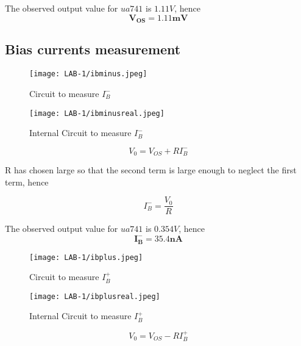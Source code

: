 \documentclass[12pt]{article}
\begin{document}
        The observed output value for $ua 741$ is  $1.11V$, hence \begin{equation}
            \boxed{\mathbf{V_{OS} = 1.11mV}}
        \end{equation}
      
      \subsection{Bias currents measurement}
        \begin{figure}[H]
            \centering
            \texttt{[image: LAB-1/ibminus.jpeg]}
            \caption{Circuit to measure $I^-_B$}
        \end{figure}
        \begin{figure}[H]
            \centering
            \texttt{[image: LAB-1/ibminusreal.jpeg]}
            \caption{Internal Circuit to measure $I^-_B$}
        \end{figure}
        \begin{equation}
            V_0 = V_{OS} + RI^-_B
        \end{equation}
        
        R has chosen large so that the second term is large enough to neglect the first term, hence
        
        \begin{equation}
            I^-_B = \frac{V_0}{R}
        \end{equation}
        
        The observed output value for $ua 741$ is  $0.354V$, hence \begin{equation}
            \boxed{\mathbf{I^-_B = 35.4nA}}
        \end{equation}
        
        \begin{figure}[H]
            \centering
            \texttt{[image: LAB-1/ibplus.jpeg]}
            \caption{Circuit to measure $I^+_B$}
        \end{figure}
        \begin{figure}[H]
            \centering
            \texttt{[image: LAB-1/ibplusreal.jpeg]}
            \caption{Internal Circuit to measure $I^+_B$}
        \end{figure}
        \begin{equation}
            V_0 = V_{OS} - RI^+_B
        \end{equation}
        
\end{document}

